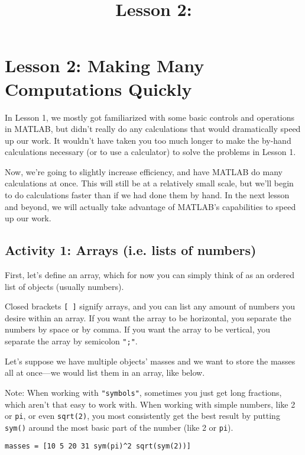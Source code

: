 \documentclass{ximera}
\title{Lesson 2: }
\begin{document}
\begin{abstract}

\end{abstract}

\section*{Lesson 2: Making Many Computations Quickly}

In Lesson 1, we mostly got familiarized with some basic controls and operations in MATLAB, but didn't really do any calculations that would dramatically speed up our work. It wouldn't have taken you too much longer to make the by-hand calculations necessary (or to use a calculator) to solve the problems in Lesson 1.

Now, we're going to slightly increase efficiency, and have MATLAB do many calculations at once. This will still be at a relatively small scale, but we'll begin to do calculations faster than if we had done them by hand. In the next lesson and beyond, we will actually take advantage of MATLAB's capabilities to speed up our work.

\subsection*{Activity 1: Arrays (i.e. lists of numbers)}

First, let's define an array, which for now you can simply think of as an ordered list of objects (usually numbers).

Closed brackets \texttt{[ ]} signify arrays, and you can list any amount of numbers you desire within an array. If you want the array to be horizontal, you separate the numbers by space or by comma. If you want the array to be vertical, you separate the array by semicolon \texttt{";"}.

Let's suppose we have multiple objects' masses and we want to store the masses all at once—we would list them in an array, like below.

\begin{remark}
Note: When working with \texttt{"symbols"}, sometimes you just get long fractions, which aren't that easy to work with. When working with simple numbers, like 2 or \texttt{pi}, or even \texttt{sqrt(2)}, you most consistently get the best result by putting \texttt{sym()} around the most basic part of the number (like 2 or \texttt{pi}).
\end{remark}

\begin{verbatim}
masses = [10 5 20 31 sym(pi)^2 sqrt(sym(2))]
\end{verbatim}
\end{document}
